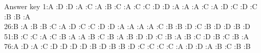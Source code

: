 \documentclass[aspectratio=169,10pt]{beamer}
\begin{document}
\begin{frame}{Answer key}
\small
1:A :D :D :A :C :A :B :C :A :C :C :D :D :A :A :A :C :A :D :C :D :C :B :B :A \\[6pt]
26:B :A :B :B :C :A :D :C :C :D :D :A :A :A :A :C :B :B :D :C :B :D :D :B :D \\[6pt]
51:B :C :C :A :C :B :A :A :B :C :B :A :B :D :D :C :B :A :B :C :D :B :C :B :A \\[6pt]
76:A :D :A :C :D :D :D :D :B :D :B :B :D :C :C :C :C :A :D :D :A :B :C :B :B
\end{frame}
\end{document}
